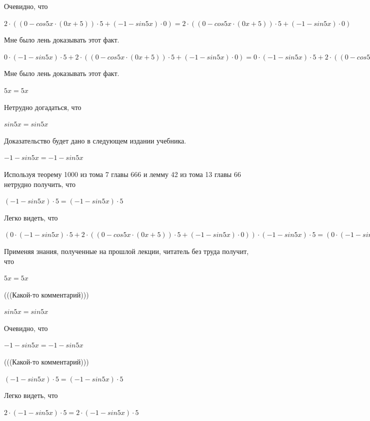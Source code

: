 \documentclass[12pt,a4paper,fleqn]{article}
\theoremstyle{definition}
\begin{document}
Очевидно, что 

$ 2  \cdot (( 0  - cos 5  x  \cdot ( 0  x  +  5 )) \cdot  5  + ( -1  - sin 5  x ) \cdot  0 ) =  2  \cdot (( 0  - cos 5  x  \cdot ( 0  x  +  5 )) \cdot  5  + ( -1  - sin 5  x ) \cdot  0 )$

Мне было лень доказывать этот факт.

$ 0  \cdot ( -1  - sin 5  x ) \cdot  5  +  2  \cdot (( 0  - cos 5  x  \cdot ( 0  x  +  5 )) \cdot  5  + ( -1  - sin 5  x ) \cdot  0 ) =  0  \cdot ( -1  - sin 5  x ) \cdot  5  +  2  \cdot (( 0  - cos 5  x  \cdot ( 0  x  +  5 )) \cdot  5  + ( -1  - sin 5  x ) \cdot  0 )$

Мне было лень доказывать этот факт.

$ 5  x  =  5  x $

Нетрудно догадаться, что 

$sin 5  x  = sin 5  x $

Доказательство будет дано в следующем издании учебника. 

$ -1  - sin 5  x  =  -1  - sin 5  x $

Используя теорему 1000 из тома 7 главы 666 и лемму 42 из тома 13 главы 66 нетрудно получить, что 

$( -1  - sin 5  x ) \cdot  5  = ( -1  - sin 5  x ) \cdot  5 $

Легко видеть, что 

$( 0  \cdot ( -1  - sin 5  x ) \cdot  5  +  2  \cdot (( 0  - cos 5  x  \cdot ( 0  x  +  5 )) \cdot  5  + ( -1  - sin 5  x ) \cdot  0 )) \cdot ( -1  - sin 5  x ) \cdot  5  = ( 0  \cdot ( -1  - sin 5  x ) \cdot  5  +  2  \cdot (( 0  - cos 5  x  \cdot ( 0  x  +  5 )) \cdot  5  + ( -1  - sin 5  x ) \cdot  0 )) \cdot ( -1  - sin 5  x ) \cdot  5 $

Применяя знания, полученные на прошлой лекции, читатель без труда получит, что 

$ 5  x  =  5  x $

(((Какой-то комментарий))) 

$sin 5  x  = sin 5  x $

Очевидно, что 

$ -1  - sin 5  x  =  -1  - sin 5  x $

(((Какой-то комментарий))) 

$( -1  - sin 5  x ) \cdot  5  = ( -1  - sin 5  x ) \cdot  5 $

Легко видеть, что 

$ 2  \cdot ( -1  - sin 5  x ) \cdot  5  =  2  \cdot ( -1  - sin 5  x ) \cdot  5 $
\end{document}
